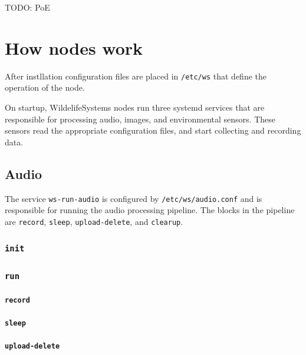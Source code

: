 \documentclass[
]{book}
\begin{document}
TODO: PoE

\chapter{How nodes work}\label{how-nodes-work}

After instllation configuration files are placed in \texttt{/etc/ws} that define the operation of the node.

On startup, WildelifeSystems nodes run three systemd services that are responsible for processing audio, images, and environmental sensors. These sensors read the appropriate configuration files, and start collecting and recording data.

\section{Audio}\label{audio}

The service \texttt{ws-run-audio} is configured by \texttt{/etc/ws/audio.conf} and is responsible for running the audio processing pipeline. The blocks in the pipeline are \texttt{record}, \texttt{sleep}, \texttt{upload-delete}, and \texttt{clearup}.

\subsection{\texorpdfstring{\texttt{init}}{init}}\label{init}

\subsection{\texorpdfstring{\texttt{run}}{run}}\label{run}

\subsubsection{\texorpdfstring{\texttt{record}}{record}}\label{record}

\subsubsection{\texorpdfstring{\texttt{sleep}}{sleep}}\label{sleep}

\subsubsection{\texorpdfstring{\texttt{upload-delete}}{upload-delete}}\label{upload-delete}
\end{document}
